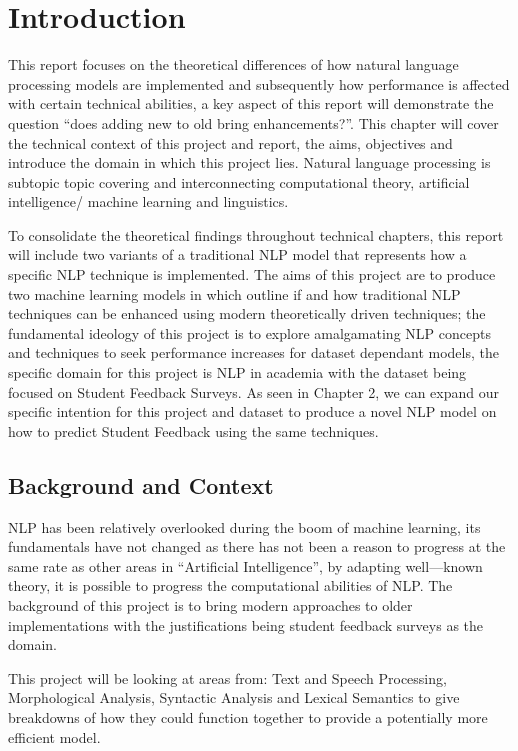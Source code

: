 \chapter{Introduction} \label{Introduction}

This report focuses on the theoretical differences of how natural language processing models are implemented and subsequently how performance is affected with certain technical abilities, a key aspect of this report will demonstrate the question “does adding new to old bring enhancements?”. This chapter will cover the technical context of this project and report, the aims, objectives and introduce the domain in which this project lies. Natural language processing is subtopic topic covering and interconnecting computational theory, artificial intelligence/ machine learning and linguistics.

To consolidate the theoretical findings throughout technical chapters, this report will include two variants of a traditional NLP model that represents how a specific NLP technique is implemented. The aims of this project are to produce two machine learning models in which outline if and how traditional NLP techniques can be enhanced using modern theoretically driven techniques; the fundamental ideology of this project is to explore amalgamating NLP concepts and techniques to seek performance increases for dataset dependant models, the specific domain for this project is NLP in academia with the dataset being focused on Student Feedback Surveys. As seen in Chapter 2, we can expand our specific intention for this project and dataset to produce a novel NLP model on how to predict Student Feedback using the same techniques.

\section{Background and Context}

NLP has been relatively overlooked during the boom of machine learning, its fundamentals have not changed as there has not been a reason to progress at the same rate as other areas in “Artificial Intelligence”, by adapting well---known theory, it is possible to progress the computational abilities of NLP. The background of this project is to bring modern approaches to older implementations with the justifications being student feedback surveys as the domain.

This project will be looking at areas from: Text and Speech Processing, Morphological Analysis, Syntactic Analysis and Lexical Semantics to give breakdowns of how they could function together to provide a potentially more efficient model.

